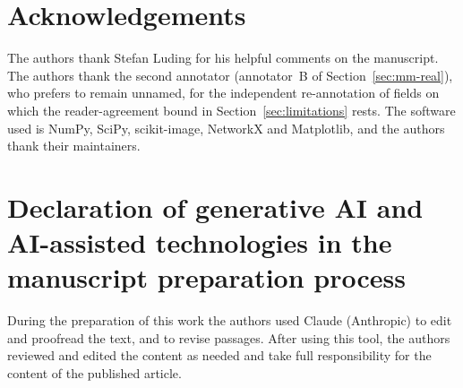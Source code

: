 \documentclass[times, review, 10pt]{elsarticle}
\begin{document}
\section*{Acknowledgements}
The authors thank Stefan Luding for his helpful comments on the
manuscript.
The authors thank the second annotator (annotator~B of
Section~\ref{sec:mm-real}), who prefers to remain unnamed, for the independent
re-annotation of \PlectaInterAnnotatorFieldCount{} fields on which the
reader-agreement bound in Section~\ref{sec:limitations} rests.
The software used is NumPy, SciPy, scikit-image, NetworkX and Matplotlib, and
the authors thank their maintainers.

\section*{Declaration of generative AI and AI-assisted technologies in the manuscript preparation process}
During the preparation of this work the authors used Claude (Anthropic) to
edit and proofread the text, and to revise passages. After using this tool,
the authors reviewed and edited the content as needed and take full
responsibility for the content of the published article.

\setlength{\bibsep}{0pt plus 0.3ex}
\renewcommand{\bibfont}{\footnotesize}


\end{document}
